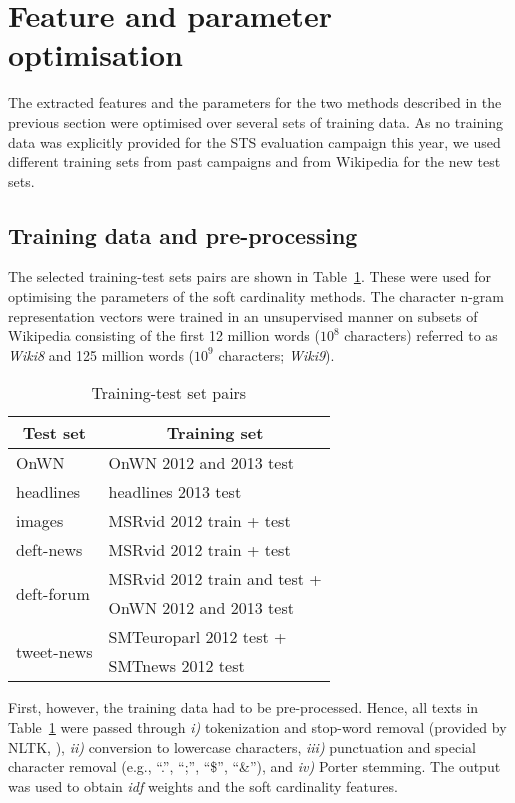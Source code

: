 \section{Feature and parameter optimisation}
\label{sec:optimisation}

The extracted features and the parameters for the two methods described
in the previous section were optimised over several sets of training data.
As no training data was explicitly provided for the STS evaluation campaign
this year, we used different training sets from past campaigns and from
Wikipedia for the new test sets.

\subsection{Training data and pre-processing}
\label{preprocessing}

The selected training-test sets pairs are shown in Table~\ref{tab:training-test-sets}.
These were used for optimising the parameters of the soft cardinality methods.
The character n-gram representation vectors were trained in an unsupervised manner on subsets of 
Wikipedia consisting of the first 12 million words ($10^8$ characters) referred 
to as {\it Wiki8} and 125 million words ($10^9$ characters; {\it Wiki9}).

\begin{table}[t!]
\begin{centering}
\begin{tabular}{|l|l|}
\hline 
\multicolumn{1}{|c|}{\bf Test set} & \multicolumn{1}{c|}{\bf Training set}\tabularnewline
\hline 
{ OnWN} & { OnWN 2012 and 2013 test}\tabularnewline
\hline 
{ headlines} & { headlines 2013 test}\tabularnewline
\hline 
{ images} & { MSRvid 2012 train + test}\tabularnewline
\hline 
{ deft-news} & { MSRvid 2012 train + test}\tabularnewline
\hline 
\multirow{2}{*}{{ deft-forum}} & { MSRvid 2012 train and test +}\tabularnewline
 & { OnWN 2012 and 2013 test}\tabularnewline
\hline 
\multirow{2}{*}{{ tweet-news}} & { SMTeuroparl 2012 test +}\tabularnewline
 & { SMTnews 2012 test }\tabularnewline
\hline 
\end{tabular}
\par\end{centering}

\centering{}\caption{Training-test set pairs\label{tab:training-test-sets}}
\end{table}

First, however, the training data had to be pre-processed.
Hence, all texts in Table~\ref{tab:training-test-sets} were passed through
\emph{i)} tokenization and stop-word removal (provided by NLTK, ),
\emph{ii)} conversion to lowercase characters, 
\emph{iii)} punctuation and special character removal (e.g., ``.'', ``;'', ``\$'', ``\&''),
and \emph{iv)} Porter stemming.
The output was used to obtain \emph{idf} weights and the soft cardinality features.

